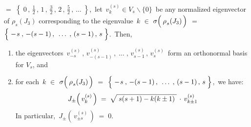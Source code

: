 \begin{theorem}
\begin{enumerate}
	$=$ $\left\{\; 0 \,,\, \frac{1}{2}\,,\, 1\,,\, \frac{3}{2}\,,\, 2\,,\, \frac{5}{2}\,,\, \ldots \;\right\}$,\,
	let \,$v^{(s)}_{k} \in V_{s}\backslash\{0\}$\, be any normalized eigenvector
	of $\rho_{s}(J_{3})$ corresponding to the eigenvalue
	\,$k$ $\in$ $\sigma\!\left(\,\overset{{\color{white}-}}{\rho}_{s}(J_{3})\,\right)$
	$=$ $\left\{\;-\overset{{\color{white}-}}{s} \,,\, -(s-1) \,,\, \;\ldots\;,\, (s-1) \,,\, s\;\right\}$.\,
	Then, 
	\begin{enumerate}
	\item
		the eigenvectors
		\,$v^{(s)}_{-s} \,,\, v^{(s)}_{-(s-1)} \,,\; \ldots \;,\, v^{(s)}_{s-1} \,,\, v^{(s)}_{s}$\,
		form an orthonormal basis for $V_{s}$, and
	\item
		for each \,$k$ $\in$ $\sigma\!\left(\,\overset{{\color{white}-}}{\rho}_{s}(J_{3})\,\right)$
		$=$ $\left\{\;-\overset{{\color{white}-}}{s} \,,\, -(s-1) \,,\, \;\ldots\;,\, (s-1) \,,\, s\;\right\}$,\,
		we have:
		\begin{equation*}
		J_{\pm}\!\left(\,v^{(s)}_{k}\,\right)
		\; = \;
			\sqrt{{\color{white}.}
			s(s+1) - k(k \pm 1)
			{\color{white}.}}
			\,\cdot\,
			v^{(s)}_{k \pm 1}
		\end{equation*}
		In particular, \,$J_{\pm}\!\left(\,v^{(s)}_{\pm s}\,\right) \; = \; 0$.
	\end{enumerate}
\end{enumerate}
\end{theorem}


